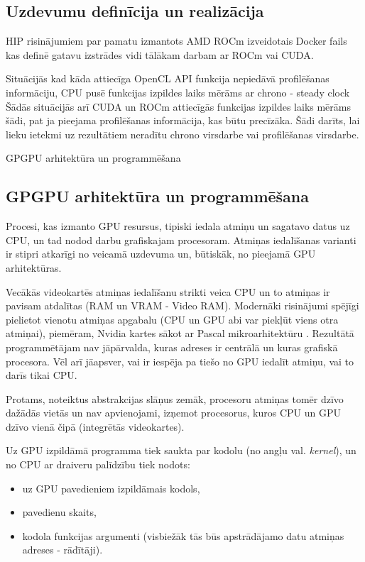 \documentclass[12pt]{report}%
\theoremstyle{definition}
\begin{document}
\begin{center}
    \chapter{Uzdevumu definīcija un realizācija}
\end{center}

HIP risinājumiem par pamatu izmantots AMD ROCm izveidotais Docker fails \cite{hip-lib-docker}
kas definē gatavu izstrādes vidi tālākam darbam ar ROCm vai CUDA.



Situācijās kad kāda attiecīga OpenCL API funkcija nepiedāvā profilēšanas informāciju, CPU pusē funkcijas izpildes laiks mērāms ar chrono - steady clock 
Šādās situācijās arī CUDA un ROCm attiecīgās funkcijas izpildes laiks mērāms šādi, pat ja pieejama profilēšanas informācija, kas būtu precīzāka.
Šādi darīts, lai lieku ietekmi uz rezultātiem neradītu chrono virsdarbe vai profilēšanas virsdarbe.

GPGPU arhitektūra un programmēšana
\begin{center}
\chapter{GPGPU arhitektūra un programmēšana}
\end{center}

Procesi, kas izmanto GPU resursus, tipiski iedala atmiņu un sagatavo datus uz CPU, un tad nodod darbu
grafiskajam procesoram. Atmiņas iedalīšanas varianti ir stipri atkarīgi no veicamā uzdevuma un, būtiskāk, no
pieejamā GPU arhitektūras.

Vecākās videokartēs atmiņas iedalīšanu strikti veica CPU un to atmiņas ir pavisam atdalītas 
(RAM un VRAM - Video RAM). Modernāki risinājumi spējīgi pielietot vienotu
atmiņas apgabalu (CPU un GPU abi var piekļūt viens otra atmiņai), piemēram, Nvidia kartes sākot ar Pascal
mikroarhitektūru \cite{nvidia_tesla_p100}. Rezultātā programmētājam nav jāpārvalda,
kuras adreses ir centrālā un kuras grafiskā procesora. Vēl arī jāapsver, vai ir iespēja pa tiešo no GPU
iedalīt atmiņu, vai to darīs tikai CPU.

Protams, noteiktus abstrakcijas slāņus zemāk, procesoru atmiņas tomēr dzīvo dažādās vietās un nav apvienojami,
izņemot procesorus, kuros CPU un GPU dzīvo vienā čipā (integrētās videokartes).

Uz GPU izpildāmā programma tiek saukta par kodolu (no angļu val. \textit{kernel}), un no CPU ar draiveru
palīdzību tiek nodots:
\begin{itemize}
    \item uz GPU pavedieniem izpildāmais kodols,
    \item pavedienu skaits,
    \item kodola funkcijas argumenti (visbiežāk tās būs apstrādājamo datu atmiņas adreses - rādītāji).
\end{itemize}
\end{document}
